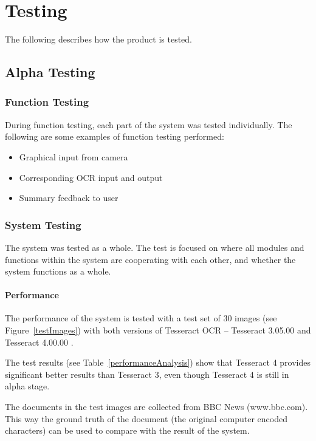 \chapter{Testing}

	The following describes how the product is tested.

	\section{Alpha Testing}
		\subsection{Function Testing}

		During function testing, each part of the system was tested individually.
		The following are some examples of function testing performed:
		\begin{itemize}
			\item Graphical input from camera
			\item Corresponding OCR input and output
			\item Summary feedback to user
		\end{itemize}

		\subsection{System Testing}

		The system was tested as a whole. The test is focused on where all modules and functions within the system are cooperating with each other, and whether the system functions as a whole.
		
		\subsubsection{Performance}
		The performance of the system is tested with a test set of 30 images (see Figure~\ref{testImages}) with both versions of Tesseract OCR – Tesseract 3.05.00 \cite{tesseract3} and Tesseract 4.00.00 \cite{tesseract4}.
		
		The test results (see Table~\ref{performanceAnalysis}) show that Tesseract 4 provides significant better results than Tesseract 3, even though Tesseract 4 is still in alpha stage.
		
		The documents in the test images are collected from BBC News (www.bbc.com). This way the ground truth of the document (the original computer encoded characters) can be used to compare with the result of the system.
		
